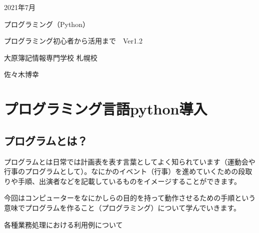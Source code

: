 \documentclass[11pt,a4paper,dvipdfmx,titlepage]{jsreport}
\begin{document}
\begin{center}
  \huge 2021年7月　\par
  \vspace{15mm}
  \huge プログラミング（Python） \par
  \vspace{15mm}
  \LARGE  プログラミング初心者から活用まで　Ver1.2\par
  \vspace{100mm}
\end{center}
 
\begin{flushright}
 \Large 大原簿記情報専門学校 札幌校 \par
  \vspace{15mm}
  \Large 佐々木博幸 \par
  \vspace{10mm}
\end{flushright}
\thispagestyle{empty}
\clearpage
\addtocounter{page}{-1}
\newpage

\tableofcontents
\printindex
\chapter{プログラミング言語python導入}

\section{プログラムとは？}
プログラムとは日常では計画表を表す言葉としてよく知られています（運動会や行事のプログラムとして）。なにかのイベント（行事）を進めていくための段取りや手順、出演者などを記載しているものをイメージすることができます。



今回はコンピューターをなにかしらの目的を持って動作させるための手順という意味でプログラムを作ること（プログラミング）について学んでいきます。


各種業務処理における利用例について
\end{document}
